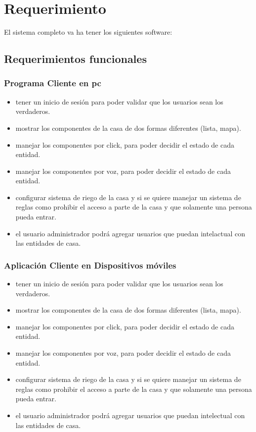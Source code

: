 \section{Requerimiento}
El sistema completo va ha tener los siguientes software:

\subsection{Requerimientos funcionales}
\subsubsection{Programa Cliente en pc}
\begin{itemize}
\item tener un inicio de sesión para poder validar que los usuarios sean los verdaderos.
\item mostrar los componentes de la casa de dos formas diferentes (lista, mapa).
\item manejar los componentes por click, para poder decidir el estado de cada entidad.
\item manejar los componentes por voz, para poder decidir el estado de cada entidad.
\item configurar sistema de riego de la casa y si se quiere manejar un sistema de reglas como prohibir el acceso a parte de la casa y que solamente una persona pueda entrar.
\item el usuario administrador podrá agregar usuarios que puedan intelactual con las entidades de casa.
\end{itemize}
\subsubsection{Aplicación Cliente en Dispositivos móviles}
\begin{itemize}
\item tener un inicio de sesión para poder validar que los usuarios sean los verdaderos.
\item mostrar los componentes de la casa de dos formas diferentes (lista, mapa).
\item manejar los componentes por click, para poder decidir el estado de cada entidad.
\item manejar los componentes por voz, para poder decidir el estado de cada entidad.
\item configurar sistema de riego de la casa y si se quiere manejar un sistema de reglas como prohibir el acceso a parte de la casa y que solamente una persona pueda entrar.
\item el usuario administrador podrá agregar usuarios que puedan intelectual con las entidades de casa.
\end{itemize}
